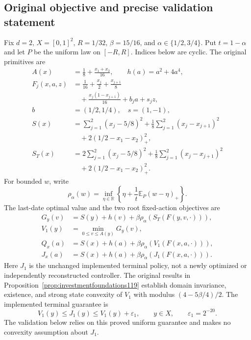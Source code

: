\subsection{Original objective and precise validation statement}
Fix $d=2$, $X=[0,1]^2$, $R=1/32$, $\beta=15/16$, and
$\alpha\in\{1/2,3/4\}$.  Put $t=1-\alpha$ and let $P$ be the
uniform law on $[-R,R]$.  Indices below are cyclic.  The original primitives are
\begin{align*}
 A(x)&=\frac18+\frac{x_1+x_2}{16},\qquad h(a)=a^2+4a^4,\\
 F_j(x,a,z)&=\frac1{16}+\frac{x_j}{2}+\frac{x_{j+1}}8\\
       &\quad+\frac{x_j(1-x_{j+1})}{16}+b_ja+s_jz,\\
 b&=(1/2,1/4),\quad s=(1,-1),\\
 S(x)&=\sum_{j=1}^2(x_j-5/8)^2
       +\frac18\sum_{j=1}^2(x_j-x_{j+1})^2\\
       &\quad+2(1/2-x_1-x_2)_+^2,\\
 S_T(x)&=2\sum_{j=1}^2(x_j-5/8)^2
       +\frac18\sum_{j=1}^2(x_j-x_{j+1})^2\\
       &\quad+2(1/2-x_1-x_2)_+^2.
\end{align*}
For bounded $w$, write
\[
 \rho_\alpha(w)=\inf_{\eta\in\mathbb R}
       \left\{\eta+\frac1t\mathbb E_P(w-\eta)_+\right\}.
\]
The last-date optimal value and the two root fixed-action objectives are
\begin{align*}
 G_y(v)&=S(y)+h(v)+\beta\rho_\alpha(S_T(F(y,v,\cdot))),\\
 V_1(y)&=\min_{0\le v\le A(y)}G_y(v),\\
 Q_x(a)&=S(x)+h(a)+\beta\rho_\alpha(V_1(F(x,a,\cdot))),\\
 J_x(a)&=S(x)+h(a)+\beta\rho_\alpha(J_1(F(x,a,\cdot))).
\end{align*}
Here $J_1$ is the unchanged implemented terminal policy, not a newly
optimized or independently reconstructed controller.  The original results
in Proposition~\ref{prop:investmentfoundations119} establish domain
invariance, existence, and strong state convexity of $V_1$ with modulus
$(4-5\beta/4)/2$.  The implemented terminal guarantee is
\begin{equation}\label{eq:independentterminalallowance119}
  V_1(y)\le J_1(y)\le V_1(y)+\varepsilon_1,
  \qquad y\in X,\qquad \varepsilon_1=2^{-20}.
\end{equation}
The validation below relies on this proved uniform guarantee and makes no
convexity assumption about $J_1$.

